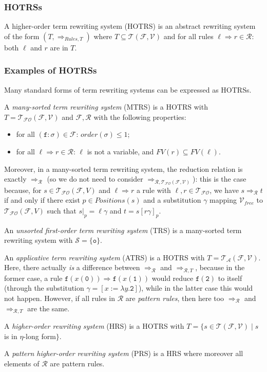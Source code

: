 \documentclass{lmcs}
\theoremstyle{theorem}\newtheorem{theorem}{Theorem}
\theoremstyle{theorem}\newtheorem{lemma}[theorem]{Lemma}
\theoremstyle{theorem}\newtheorem{corollary}[theorem]{Corollary}
\theoremstyle{definition}\newtheorem{definition}[theorem]{Definition}
\theoremstyle{definition}\newtheorem{example}[theorem]{Example}
\newcommand{\F}{\mathcal{F}}
\newcommand{\V}{\mathcal{V}}
\newcommand{\Vfree}{\mathcal{V}_{\mathit{free}}}
\newcommand{\Sorts}{\mathcal{S}}
\newcommand{\Terms}{\mathcal{T}}
\newcommand{\ATerms}{\mathcal{T}_{\mathcal{A}}}
\newcommand{\FOTerms}{\mathcal{T}_{\mathcal{FO}}}
\newcommand{\Rules}{\mathcal{R}}
\newcommand{\FV}{\mathit{FV}}
\newcommand{\Positions}{\mathit{Positions}}
\newcommand{\order}{\mathit{order}}
\newcommand{\atype}{\sigma}
\newcommand{\identifier}[1]{\mathtt{#1}}
\newcommand{\afun}{\identifier{f}}
\newcommand{\avar}{x}
\newcommand{\bvar}{y}
\newcommand{\abs}[2]{\lambda #1.#2}
\newcommand{\arrz}{\Rightarrow}
\newcommand{\arr}[1]{\arrz_{#1}}
\newcommand{\symb}[1]{\mathtt{#1}}
\newcommand{\nul}{\symb{0}}
\newcommand{\unitsort}{\mathtt{o}}
\newcommand{\mysubsection}[1]{\vspace{-12pt}\subsubsection{#1}}
\begin{document}
\mysubsection{HOTRSs}

A higher-order term rewriting system (HOTRS) is an abstract rewriting system of the form
$(T,\arr{Rules,T})$ where $T \subseteq \Terms(\F,\V)$ and for all rules $\ell \arrz r \in \Rules$:
both $\ell$ and $r$ are in $T$.

\mysubsection{Examples of HOTRSs}
Many standard forms of term rewriting systems can be expressed as HOTRSs.

A \emph{many-sorted term rewriting system} (MTRS) is a HOTRS with $T = \FOTerms(\F,\V)$ and
$\F,\Rules$ with the following properties:
\begin{itemize}
\item for all $(\afun : \atype) \in \F$: $\order(\atype) \leq 1$;
\item for all $\ell \arrz r \in \Rules$: $\ell$ is not a variable, and $\FV(r) \subseteq \FV(\ell)$.
\end{itemize}
Moreover, in a many-sorted term rewriting system, the reduction relation is exactly $\arr{\Rules}$
(so we do not need to consider $\arr{\Rules,\FOTerms(\F,\V)}$): this is the case because, for
$s \in \FOTerms(\F,V)$ and $\ell \arrz r$ a rule with $\ell,r \in \FOTerms$, we have
$s \arr{\Rules} t$ if and only if there exist $p \in \Positions(s)$ and a substitution $\gamma$
mapping $\Vfree$ to $\FOTerms(\F,V)$ such that $s|_p = \ell\gamma$ and $t = s[r\gamma]_p$.

An \emph{unsorted first-order term rewriting system} (TRS) is a many-sorted term rewriting system
with $\Sorts = \{ \unitsort \}$.

An \emph{applicative term rewriting system} (ATRS) is a HOTRS with $T = \ATerms(\F,\V)$.  Here,
there actually \emph{is} a difference between $\arr{\Rules}$ and $\arr{\Rules,T}$, because in the
former case, a rule $\afun(\avar(\nul)) \arrz \afun(\avar(\symb{1}))$ would reduce
$\afun(\symb{2})$ to itself (through the substitution $\gamma = [\avar:=\abs{\bvar}{\symb{2}}]$),
while in the latter case this would not happen.  However, if all rules in $\Rules$ are
\emph{pattern rules}, then here too $\arr{\Rules}$ and $\arr{\Rules,T}$ are the same.

A \emph{higher-order rewriting system} (HRS) is a HOTRS with $T = \{ s \in \Terms(\F,\V) \mid s$
is in $\eta$-long form$\}$.

A \emph{pattern higher-order rewriting system} (PRS) is a HRS where moreover all elements of
$\Rules$ are pattern rules.
\end{document}

